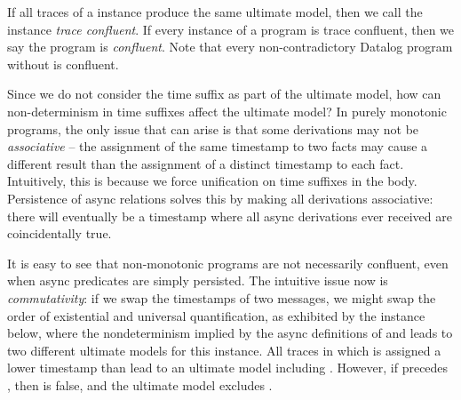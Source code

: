 If all traces of a \lang instance produce the same ultimate model, then we
call the instance {\em trace confluent}.  If every instance of a program is
trace confluent, then we say the program is {\em confluent}.  Note that every
non-contradictory Datalog program without  is confluent.


Since we do not consider the time suffix as part of the ultimate model, how can
non-determinism in time suffixes affect the ultimate model?  In purely
monotonic programs, the only issue that can arise is that some derivations may
not be {\em associative} -- the assignment of the same timestamp to two facts
may cause a different result than the assignment of a distinct timestamp to
each fact.  Intuitively, this is because we force unification on time suffixes
in the body.  Persistence of async relations  solves this by making all
derivations associative: there will eventually be a timestamp where all async
derivations ever received are coincidentally true.


It is easy to see that non-monotonic programs are not necessarily confluent,
even when async predicates are simply persisted.  The intuitive issue now is
{\em commutativity}: if we swap the timestamps of two messages, we might swap
the order of existential and universal quantification, as exhibited by the
instance below, where the 
nondeterminism implied by the async definitions of  and 
leads to two different ultimate models for this instance.  All traces in which
 is assigned a lower timestamp than  lead to an ultimate
model including .  However, if  precedes
, then  is false, and the ultimate model
excludes .

